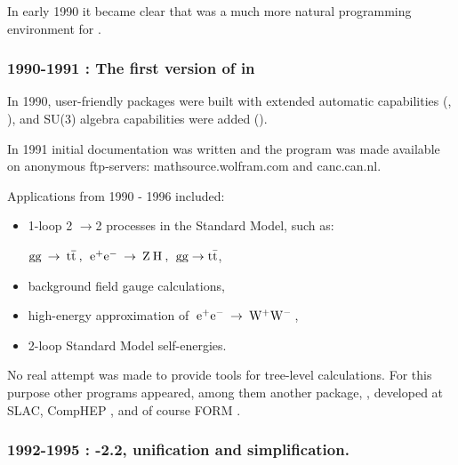 In early 1990 it became clear that \mma was a much more natural programming environment for \fc.

\subsubsection*{1990-1991 : The first version  of \fc in \mma}

In 1990, user-friendly  packages were built with extended automatic capabilities (, ), and SU(3) algebra capabilities were added ().

In 1991 initial documentation was written and the program was made available on anonymous ftp-servers: mathsource.wolfram.com and canc.can.nl.

Applications from 1990 - 1996  included:

\begin{itemize}

\item 1-loop 2 \(\rightarrow \)2 processes in the Standard
Model, such as:

\({\rm gg}\> \rightarrow \> 
{\rm t \overline{t}} \> , \> \>
{{\rm e}^+}{{\rm e}^-}\> \rightarrow \> {\rm Z}\> {\rm H}\>, \> \>
{\rm gg} \rightarrow {\rm t\bar{t}} \),

\item background field gauge calculations,

\item high-energy approximation of \(\>{{\rm e}^+}
{{\rm e}^-}\> \rightarrow \> {{\rm W}^+}{{\rm W}^-}\> \),

\item  2-loop Standard Model self-energies.

\end{itemize}

No real attempt was made to provide tools for tree-level calculations. 
For this purpose other programs appeared, among them another  \mma package, \hip \cite{yeh}, developed at SLAC, 
CompHEP \cite{Pukhov:1999gg}, and of course FORM \cite{Vermaseren:2000nd}.

\subsubsection*{1992-1995 : -2.2, unification and simplification.}

